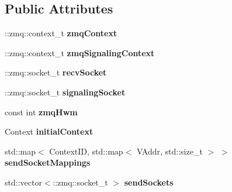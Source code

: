 \subsection*{Public Attributes}
\begin{DoxyCompactItemize}
\item 
\hypertarget{structgraybat_1_1communicationPolicy_1_1ZMQ_ac28925f4c8d0617d97283c18ed164217}{}\+::zmq\+::context\+\_\+t {\bfseries zmq\+Context}\label{structgraybat_1_1communicationPolicy_1_1ZMQ_ac28925f4c8d0617d97283c18ed164217}

\item 
\hypertarget{structgraybat_1_1communicationPolicy_1_1ZMQ_a7f9215005287fcb30fb21d21b10405fb}{}\+::zmq\+::context\+\_\+t {\bfseries zmq\+Signaling\+Context}\label{structgraybat_1_1communicationPolicy_1_1ZMQ_a7f9215005287fcb30fb21d21b10405fb}

\item 
\hypertarget{structgraybat_1_1communicationPolicy_1_1ZMQ_a55d3e9da96fd2deeada98ee678860cf9}{}\+::zmq\+::socket\+\_\+t {\bfseries recv\+Socket}\label{structgraybat_1_1communicationPolicy_1_1ZMQ_a55d3e9da96fd2deeada98ee678860cf9}

\item 
\hypertarget{structgraybat_1_1communicationPolicy_1_1ZMQ_ad3d52816f168d192b556ac1dc3d1e885}{}\+::zmq\+::socket\+\_\+t {\bfseries signaling\+Socket}\label{structgraybat_1_1communicationPolicy_1_1ZMQ_ad3d52816f168d192b556ac1dc3d1e885}

\item 
\hypertarget{structgraybat_1_1communicationPolicy_1_1ZMQ_a9d39af0540599d02ca1fbe3c3a3c53c6}{}const int {\bfseries zmq\+Hwm}\label{structgraybat_1_1communicationPolicy_1_1ZMQ_a9d39af0540599d02ca1fbe3c3a3c53c6}

\item 
\hypertarget{structgraybat_1_1communicationPolicy_1_1ZMQ_ac3194b52e98b31ada473e873f631b907}{}Context {\bfseries initial\+Context}\label{structgraybat_1_1communicationPolicy_1_1ZMQ_ac3194b52e98b31ada473e873f631b907}

\item 
\hypertarget{structgraybat_1_1communicationPolicy_1_1ZMQ_aaa8ad1285b17daba34d283a34349e3bc}{}std\+::map$<$ Context\+I\+D, std\+::map$<$ V\+Addr, std\+::size\+\_\+t $>$ $>$ {\bfseries send\+Socket\+Mappings}\label{structgraybat_1_1communicationPolicy_1_1ZMQ_aaa8ad1285b17daba34d283a34349e3bc}

\item 
\hypertarget{structgraybat_1_1communicationPolicy_1_1ZMQ_a6bd8f4319623f0a5ff4954fed2802009}{}std\+::vector$<$\+::zmq\+::socket\+\_\+t $>$ {\bfseries send\+Sockets}\label{structgraybat_1_1communicationPolicy_1_1ZMQ_a6bd8f4319623f0a5ff4954fed2802009}


\end{DoxyCompactItemize}
